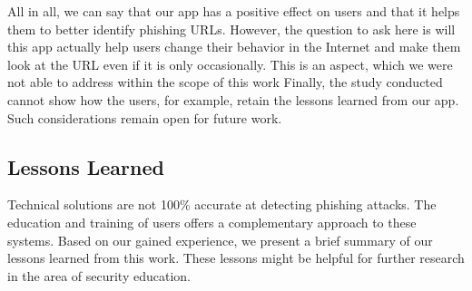 All in all, we can say that our app has a positive effect on users and that it helps them to better identify phishing URLs.
However, the question to ask here is will this app actually help users change their behavior in the Internet and make them look at the URL even if it is only occasionally.
This is an aspect, which we were not able to address within the scope of this work
Finally, the study conducted cannot show how the users, for example, retain the lessons learned from our app.
Such considerations remain open for future work.

\subsection{Lessons Learned}
Technical solutions are not 100\% accurate at detecting phishing attacks.
The education and training of users offers a complementary approach to these systems.
Based on our gained experience, we present a brief summary of our lessons learned from this work.
These lessons might be helpful for further research in the area of security education.

